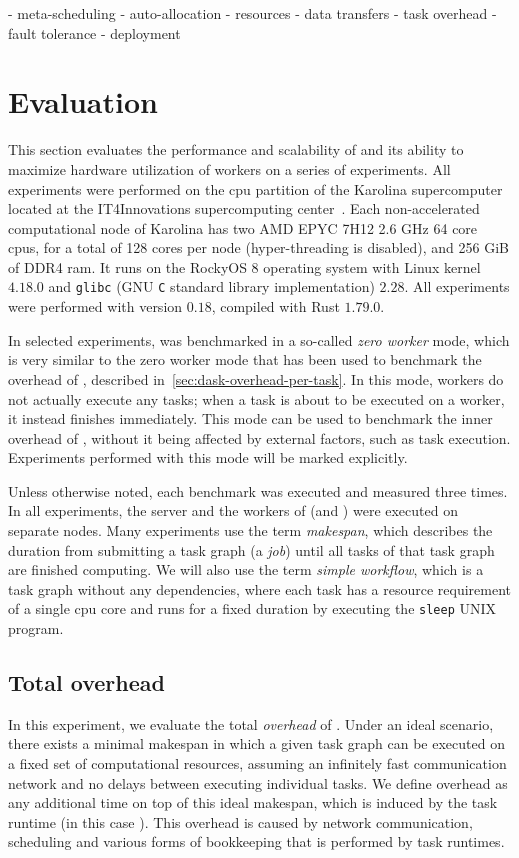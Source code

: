 - meta-scheduling
- auto-allocation
- resources
- data transfers
- task overhead
- fault tolerance
- deployment

\section{Evaluation}
This section evaluates the performance and scalability of \hyperqueue{} and its ability
to maximize hardware utilization of workers on a series of experiments. All experiments were
performed on the \gls{cpu} partition of the Karolina
supercomputer~\cite{karolina} located at the IT4Innovations supercomputing
center~\cite{it4i}. Each non-accelerated computational node of Karolina has two AMD
EPYC\texttrademark{} 7H12 2.6 GHz 64 core \glspl{cpu}, for a total of 128 cores
per node (hyper-threading is disabled), and 256 GiB of DDR4 \gls{ram}. It runs on the
RockyOS 8 operating system with Linux kernel $4.18.0$ and \texttt{glibc} (GNU \texttt{C} standard library implementation)
$2.28$. All experiments were performed with \hyperqueue{} version
$0.18$, compiled with Rust $1.79.0$.

In selected experiments, \hq{} was benchmarked in a so-called
\emph{zero worker} mode, which is very similar to the zero worker mode that has been used to
benchmark the overhead of \rsds{}, described in~\autoref{sec:dask-overhead-per-task}. In this
mode, workers do not actually execute any tasks; when a task is about to be executed on a worker,
it instead finishes immediately. This mode can be used to benchmark the inner overhead of
\hyperqueue{}, without it being affected by external factors, such as task execution.
Experiments performed with this mode will be marked explicitly.

Unless otherwise noted, each benchmark was executed and measured three times. In all experiments,
the server and the workers of \hyperqueue{} (and \dask{}) were executed on separate nodes. Many
experiments use the term \emph{makespan}, which describes the duration from submitting a
task graph (a \hyperqueue{} \emph{job}) until all tasks of that task graph
are finished computing. We will also use the term \emph{simple workflow}, which is a task graph
without any dependencies, where each task has a resource requirement of a single
\gls{cpu} core and runs for a fixed duration by executing the \texttt{sleep}
UNIX program.

\subsection{Total overhead}
\label{sec:hq-exp-total-overhead}
In this experiment, we evaluate the total \emph{overhead} of \hyperqueue{}. Under
an ideal scenario, there exists a minimal makespan in which a given task graph can be executed on a
fixed set of computational resources, assuming an infinitely fast communication network and no
delays between executing individual tasks. We define overhead as any additional time on top of this
ideal makespan, which is induced by the task runtime (in this case \hyperqueue{}). This
overhead is caused by network communication, scheduling and various forms of bookkeeping that is
performed by task runtimes.

